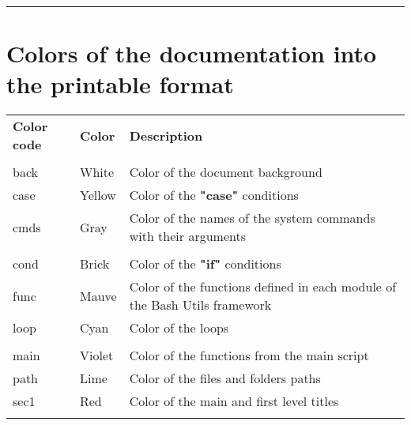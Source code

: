 \documentclass[a4paper,10pt]{article}
\begin{document}
\newpage





\color{sec1}\par\noindent\rule{\textwidth}{0.4pt}\color{text}

\color{red}
\section{Colors of the documentation into the printable format}\color{text}

\begin{justify}
    \begin{tabular}{lll}
        \textbf{Color code} & \textbf{Color}        & \textbf{Description}\\\\

        \color{text}back    & \color{text}White     & \color{text}Color of the document background\\
        \color{case}case    & \color{case}Yellow    & \color{case}Color of the \textbf{"case"} conditions\\
        \color{cmds}cmds    & \color{cmds}Gray      & \color{cmds}Color of the names of the system commands with their arguments\\\\

        \color{cond}cond    & \color{cond}Brick     & \color{cond}Color of the \textbf{"if"} conditions\\
        \color{func}func    & \color{func}Mauve     & \color{func}Color of the functions defined in each module of the Bash Utils framework\\
        \color{loop}loop    & \color{loop}Cyan      & \color{loop}Color of the loops\\\\

        \color{main}main    & \color{main}Violet    & \color{main}Color of the functions from the main script\\
        \color{path}path    & \color{path}Lime      & \color{path}Color of the files and folders paths\\
        \color{sec1}sec1    & \color{sec1}Red       & \color{sec1}Color of the main and first level titles\\\\


\end{tabular}
\end{justify}
\end{document}
